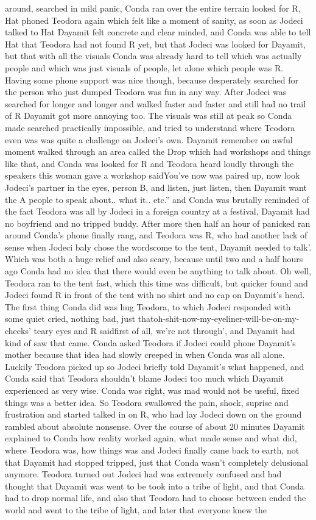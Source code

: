 \documentclass[12pt]{book}
\begin{document}
around, searched in mild panic, Conda ran over the entire terrain looked for R, Hat phoned Teodora again which felt like a moment of sanity, as soon as Jodeci talked to Hat Dayamit felt concrete and clear minded, and Conda was able to tell Hat that Teodora had not found R yet, but that Jodeci was looked for Dayamit, but that with all the visuals Conda was already hard to tell which was actually people and which was just visuals of people, let alone which people was R. Having some phone support was nice though, because desperately searched for the person who just dumped Teodora was fun in any way. After Jodeci was searched for longer and longer and walked faster and faster and still had no trail of R Dayamit got more annoying too. The visuals was still at peak so Conda made searched practically impossible, and tried to understand where Teodora even was was quite a challenge on Jodeci's own. Dayamit remember on awful moment walked through an area called the Drop which had workshops and things like that, and Conda was looked for R and Teodora heard loudly through the speakers this woman gave a workshop saidYou've now was paired up, now look Jodeci's partner in the eyes, person B, and listen, just listen, then Dayamit want the A people to speak about.. what it.. etc.'' and Conda was brutally reminded of the fact Teodora was all by Jodeci in a foreign country at a festival, Dayamit had no boyfriend and no tripped buddy. After more then half an hour of panicked ran around Conda's phone finally rang, and Teodora was R, who had another lack of sense when Jodeci baly chose the wordscome to the tent, Dayamit needed to talk'. Which was both a huge relief and also scary, because until two and a half hours ago Conda had no idea that there would even be anything to talk about. Oh well, Teodora ran to the tent fast, which this time was difficult, but quicker found and Jodeci found R in front of the tent with no shirt and no cap on Dayamit's head. The first thing Conda did was hug Teodora, to which Jodeci responded with some quiet cried, nothing bad, just thatoh-shit-now-my-eyeliner-will-be-on-my-cheeks' teary eyes and R saidfirst of all, we're not through', and Dayamit had kind of saw that came. Conda asked Teodora if Jodeci could phone Dayamit's mother because that idea had slowly creeped in when Conda was all alone. Luckily Teodora picked up so Jodeci briefly told Dayamit's what happened, and Conda said that Teodora shouldn't blame Jodeci too much which Dayamit experienced as very wise. Conda was right, was mad would not be useful, fixed things was a better idea. So Teodora swallowed the pain, shock, suprise and frustration and started talked in on R, who had lay Jodeci down on the ground rambled about absolute nonsense. Over the course of about 20 minutes Dayamit explained to Conda how reality worked again, what made sense and what did, where Teodora was, how things was and Jodeci finally came back to earth, not that Dayamit had stopped tripped, just that Conda wasn't completely delusional anymore. Teodora turned out Jodeci had was extremely confused and had thought that Dayamit was went to be took into a tribe of light, and that Conda had to drop normal life, and also that Teodora had to choose between ended the world and went to the tribe of light, and later that everyone knew the 
\end{document}
